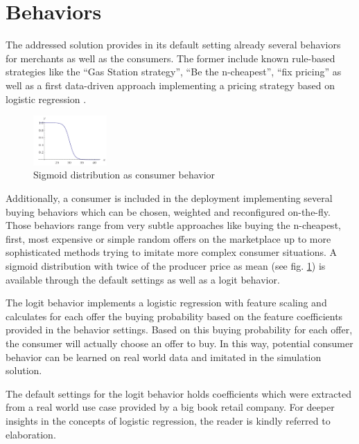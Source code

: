 \section{Behaviors}
\label{sec:Behaviors}
%
The addressed solution provides in its default setting already several behaviors for merchants as well as the consumers. The former include known rule-based strategies like the ``Gas Station strategy'', ``Be the n-cheapest'', ``fix pricing'' as well as a first data-driven approach implementing a pricing strategy based on logistic regression \citep{hosmer2013applied}.

%
\begin{figure}[h]
    \centering
    \includegraphics[width=0.25\textwidth]{images/sigmoid.png}
    \caption{Sigmoid distribution as consumer behavior}
    \label{fig:sigmoid_distribution}
\end{figure}
%

Additionally, a consumer is included in the deployment implementing several buying behaviors which can be chosen, weighted and reconfigured on-the-fly. Those behaviors range from very subtle approaches like buying the n-cheapest, first, most expensive or simple random offers on the marketplace up to more sophisticated methods trying to imitate more complex consumer situations. A sigmoid distribution with twice of the producer price as mean (see fig. \ref{fig:sigmoid_distribution}) is available through the default settings as well as a logit behavior.

The logit behavior implements a logistic regression with feature scaling and calculates for each offer the buying probability based on the feature coefficients provided in the behavior settings. Based on this buying probability for each offer, the consumer will actually choose an offer to buy. In this way, potential consumer behavior can be learned on real world data and imitated in the simulation solution.

The default settings for the logit behavior holds coefficients which were extracted from a real world use case provided by a big book retail company. For deeper insights in the concepts of logistic regression, the reader is kindly referred to \citet{hosmer2013applied} elaboration.

